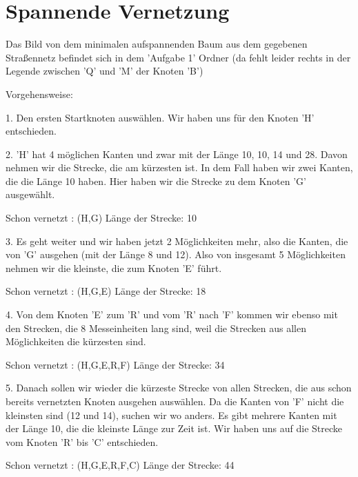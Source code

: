 \documentclass{pi2}
\begin{document}
	
	
	\section{Spannende Vernetzung}
	
	Das Bild von dem minimalen aufspannenden Baum aus dem gegebenen Straßennetz befindet sich in dem 'Aufgabe 1' Ordner (da fehlt leider rechts in der Legende zwischen 'Q' und 'M' der Knoten 'B')
	
	Vorgehensweise:
	
	1. Den ersten Startknoten auswählen. Wir haben uns für den Knoten 'H' entschieden.
	
	2. 'H' hat 4 möglichen Kanten und zwar mit der Länge 10, 10, 14 und 28. Davon nehmen wir die Strecke, die am kürzesten ist. In dem Fall haben wir zwei Kanten, die die Länge 10 haben. Hier haben wir die Strecke zu dem Knoten 'G' ausgewählt.
	
	Schon vernetzt : (H,G)
	Länge der Strecke: 10
	
	3. Es geht weiter und wir haben jetzt 2 Möglichkeiten mehr, also die Kanten, die von 'G' ausgehen (mit der Länge 8 und 12). Also von insgesamt 5 Möglichkeiten nehmen wir die kleinste, die zum Knoten 'E' führt.
	
    Schon vernetzt : (H,G,E)
	Länge der Strecke: 18
	
	4. Von dem Knoten 'E' zum 'R' und vom 'R' nach 'F' kommen wir ebenso mit den Strecken, die 8 Messeinheiten lang sind, weil die Strecken aus allen Möglichkeiten die kürzesten sind. 
	
	Schon vernetzt : (H,G,E,R,F)
	Länge der Strecke: 34
	
	5. Danach sollen wir wieder die kürzeste Strecke von allen Strecken, die aus schon bereits vernetzten Knoten ausgehen auswählen. Da die Kanten von 'F' nicht die kleinsten sind (12 und 14), suchen wir wo anders. Es gibt mehrere Kanten mit der Länge 10, die die kleinste Länge zur Zeit ist. Wir haben uns auf die Strecke vom Knoten 'R' bis 'C' entschieden. 
	
	Schon vernetzt : (H,G,E,R,F,C)
	Länge der Strecke: 44
	
\end{document}
